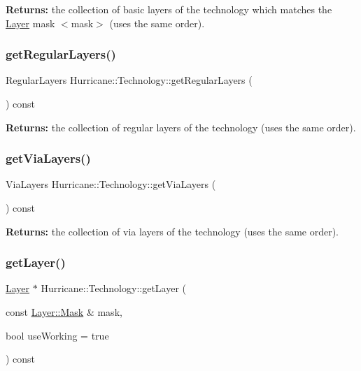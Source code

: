 {\bfseries Returns\+:} the collection of basic layers of the technology which matches the \mbox{\hyperlink{classHurricane_1_1Layer}{Layer}} mask {\ttfamily $<$mask$>$} (uses the same order). \mbox{\label{classHurricane_1_1Technology_abffce542bc1cee054b4a09c64449f3b8}} 
\subsubsection{\texorpdfstring{get\+Regular\+Layers()}{getRegularLayers()}}
{\footnotesize\ttfamily Regular\+Layers Hurricane\+::\+Technology\+::get\+Regular\+Layers (\begin{DoxyParamCaption}{ }\end{DoxyParamCaption}) const}

{\bfseries Returns\+:} the collection of regular layers of the technology (uses the same order). \mbox{\label{classHurricane_1_1Technology_aacde973f6a02a232a01f3f618576e1ee}} 
\subsubsection{\texorpdfstring{get\+Via\+Layers()}{getViaLayers()}}
{\footnotesize\ttfamily Via\+Layers Hurricane\+::\+Technology\+::get\+Via\+Layers (\begin{DoxyParamCaption}{ }\end{DoxyParamCaption}) const}

{\bfseries Returns\+:} the collection of via layers of the technology (uses the same order). \mbox{\label{classHurricane_1_1Technology_a2ab8d2c386bf3daeb2b93d92ecbac6b4}} 
\subsubsection{\texorpdfstring{get\+Layer()}{getLayer()}\hspace{0.1cm}{\footnotesize\ttfamily [2/2]}}
{\footnotesize\ttfamily \mbox{\hyperlink{classHurricane_1_1Layer}{Layer}} $\ast$ Hurricane\+::\+Technology\+::get\+Layer (\begin{DoxyParamCaption}\item[{const \mbox{\hyperlink{classHurricane_1_1Layer_af5277c670637bd5d910237e7afe01a91}{Layer\+::\+Mask}} \&}]{mask,  }\item[{bool}]{use\+Working = {\ttfamily true} }\end{DoxyParamCaption}) const}

